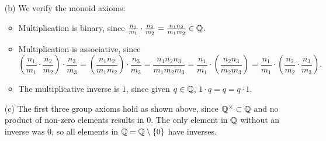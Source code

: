 \documentclass[../UNABRIDGEDalgebraNotesMSRI-UP2016.tex]{subfiles}
\begin{document}
\begin{frame}
\begin{itemize}\footnotesize
\item[(b)] We verify the monoid axioms:
	\begin{itemize}\footnotesize
	\item Multiplication is binary, since $\frac{n_1}{m_1}\cdot\frac{n_2}{m_2}=\frac{n_1n_2}{m_1m_2}\in \mathbb Q$.
	\item Multiplication is associative, since 
	\[\textstyle
	\left(\frac{n_1}{m_1}\cdot \frac{n_2}{m_2}\right)\cdot \frac{n_3}{m_3}=\left(\frac{n_1n_2}{m_1m_2}\right)\cdot \frac{n_3}{m_3} = \frac{n_1n_2n_3}{m_1m_2m_3} = \frac{n_1}{m_1}\cdot \left(\frac{n_2n_3}{m_2m_3}\right) =
	\frac{n_1}{m_1}\cdot \left(\frac{n_2}{m_2}\cdot \frac{n_3}{m_3}\right).
	\]
	\item The multiplicative inverse is $1$, since given $q\in \mathbb Q$, $1\cdot q=q=q\cdot 1$.
	\end{itemize}	

\smallGap	
\item[(c)] The first three group axioms hold as shown above, since $\mathbb Q^{\times}\subset\mathbb Q$ and no product of non-zero elements results in $0$.  The only element in $\mathbb Q$ without an inverse was $0$, so all elements in $\mathbb Q=\mathbb Q\setminus\{0\}$ have inverses. 	
\end{itemize}
\end{frame}

\end{document}
